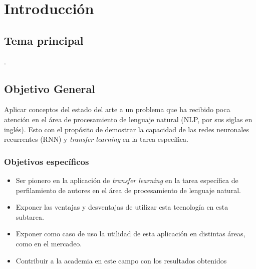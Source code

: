 
\chapter{Introducción} %

\label{Chapter1} %


\newcommand{\keyword}[1]{\textbf{#1}}
\newcommand{\tabhead}[1]{\textbf{#1}}
\newcommand{\code}[1]{\texttt{#1}}
\newcommand{\file}[1]{\texttt{\bfseries#1}}
\newcommand{\option}[1]{\texttt{\itshape#1}}


\section{Tema principal}

\ttitle.



\section{Objetivo General}

Aplicar conceptos del estado del arte a un problema que ha recibido poca atención en el área de procesamiento de lenguaje natural (NLP, por sus siglas en inglés). Esto con el propósito de demostrar la capacidad de las redes neuronales recurrentes (RNN) y \emph{transfer learning} en la tarea específica.

\subsection{Objetivos específicos}

\begin{itemize}
\item Ser pionero en la aplicación de \emph{transfer learning} en la tarea específica de perfilamiento de autores en el área de procesamiento de lenguaje natural.
\item Exponer las ventajas y desventajas de utilizar esta tecnología en esta subtarea.
\item Exponer como caso de uso la utilidad de esta aplicación en distintas áreas, como en el mercadeo.
\item Contribuir a la academia en este campo con los resultados obtenidos
\end{itemize}

